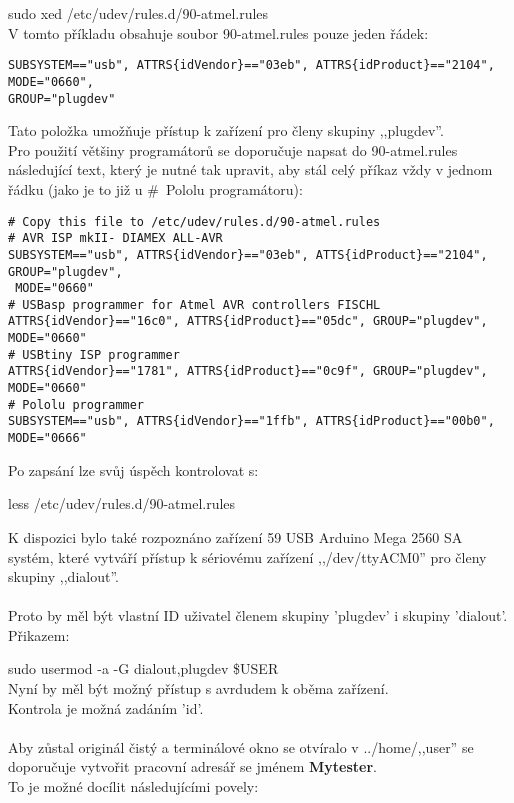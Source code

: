 sudo xed /etc/udev/rules.d/90-atmel.rules\\
V tomto příkladu obsahuje soubor 90-atmel.rules pouze jeden řádek:
\vspace*{-0.3cm}
\begin{verbatim}
SUBSYSTEM=="usb", ATTRS{idVendor}=="03eb", ATTRS{idProduct}=="2104", MODE="0660",
GROUP="plugdev"
\end{verbatim}
\vspace*{-0.3cm}
Tato položka umožňuje přístup k zařízení pro členy skupiny ,,plugdev''.
\\Pro použití většiny programátorů se doporučuje napsat do 90-atmel.rules následující text, který je nutné tak upravit, aby stál celý příkaz vždy v jednom řádku (jako je to již u \#~Pololu programátoru):
\vspace*{-0.8cm}
\begin{verbatim}
# Copy this file to /etc/udev/rules.d/90-atmel.rules
# AVR ISP mkII- DIAMEX ALL-AVR
SUBSYSTEM=="usb", ATTRS{idVendor}=="03eb", ATTS{idProduct}=="2104", GROUP="plugdev",
 MODE="0660"
# USBasp programmer for Atmel AVR controllers FISCHL
ATTRS{idVendor}=="16c0", ATTRS{idProduct}=="05dc", GROUP="plugdev", MODE="0660"
# USBtiny ISP programmer
ATTRS{idVendor}=="1781", ATTRS{idProduct}=="0c9f", GROUP="plugdev", MODE="0660"
# Pololu programmer
SUBSYSTEM=="usb", ATTRS{idVendor}=="1ffb", ATTRS{idProduct}=="00b0", MODE="0666"
\end{verbatim}
\vspace*{-0.3cm}
Po zapsání lze svůj úspěch kontrolovat s:

less /etc/udev/rules.d/90-atmel.rules

K dispozici bylo také rozpoznáno zařízení 59 USB Arduino Mega 2560 SA systém, které vytváří přístup
k sériovému zařízení ,,/dev/ttyACM0'' pro členy skupiny ,,dialout''.
\\
\\
Proto by měl být vlastní ID uživatel členem skupiny 'plugdev' i skupiny 'dialout'. Přikazem:

sudo usermod -a -G dialout,plugdev \$USER\\
Nyní by měl být možný přístup s avrdudem k oběma zařízení.\\
Kontrola je možná zadáním 'id'.\\
\\
Aby zůstal originál čistý a terminálové okno se otvíralo v ../home/,,user'' se doporučuje vytvořit pracovní adresář se jménem {\bf Mytester}.
\\
To je možné docílit následujícími povely:

